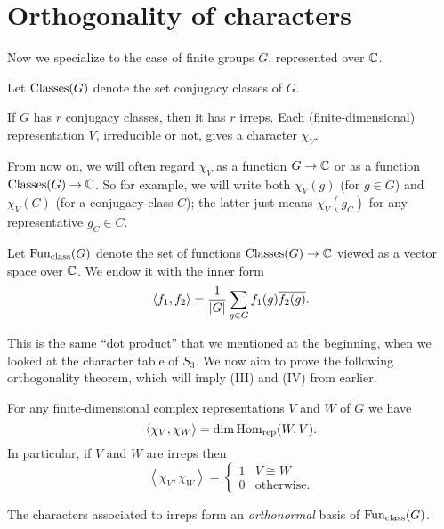 \section{Orthogonality of characters}
Now we specialize to the case of finite groups $G$, represented over $\mathbb C$.
\begin{definition}
	Let $\operatorname{Classes}(G)$ denote the set conjugacy classes of $G$.
\end{definition}
If $G$ has $r$ conjugacy classes, then it has $r$ irreps.
Each (finite-dimensional) representation $V$, irreducible or not, gives a
character $\chi_V$.
\begin{abuse}
	From now on, we will often regard $\chi_V$ as a function $G \to \mathbb C$
	or as a function $\operatorname{Classes}(G) \to \mathbb C$.
	So for example, we will write both $\chi_V(g)$ (for $g \in G$)
	and $\chi_V(C)$ (for a conjugacy class $C$);
	the latter just means $\chi_V(g_C)$ for any representative $g_C \in C$.
\end{abuse}
\begin{definition}
	Let $\operatorname{Fun}_{\mathrm{class}}(G)$ denote the set of functions $\operatorname{Classes}(G) \to \mathbb C$
	viewed as a vector space over $\mathbb C$.
	We endow it with the inner form
	\[
		\left< f_1, f_2 \right> = 
		\frac{1}{|G|}
		\sum_{g \in G} f_1(g) \overline{f_2(g)}.
	\]
\end{definition}
This is the same ``dot product'' that we mentioned at the beginning,
when we looked at the character table of $S_3$.
We now aim to prove the following orthogonality theorem,
which will imply (III) and (IV) from earlier.
\begin{theorem}[Orthogonality]
	For any finite-dimensional complex representations $V$ and $W$
	of $G$ we have
	\[ \left< \chi_V, \chi_W \right> = \dim \operatorname{Hom}_{\mathrm{rep}}(W, V). \]
	In particular, if $V$ and $W$ are irreps then
	\[ \left< \chi_V, \chi_W \right> 
		=
		\begin{cases}
			1 & V  \cong W \\
			0 & \text{otherwise}.
		\end{cases}
	\]
\end{theorem}
\begin{corollary}
	The characters associated to irreps
	form an \emph{orthonormal} basis of $\operatorname{Fun}_{\mathrm{class}}(G)$.
\end{corollary}

